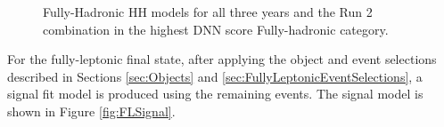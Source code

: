 \begin{figure}[!htbp]
    \setcounter{subfigure}{0}
    \centering
    \qquad
    \caption{Fully-Hadronic HH models for all three years and the Run 2 combination in the highest DNN score Fully-hadronic category.}
\end{figure}

For the fully-leptonic final state, after applying the object and event selections described in Sections \ref{sec:Objects} and \ref{sec:FullyLeptonicEventSelections},
a signal fit model is produced using the remaining events. The signal model is shown in Figure \ref{fig:FLSignal}.

